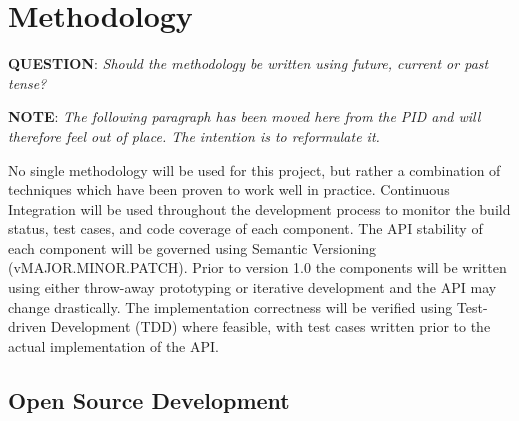 

\section{Methodology}
\label{sec:methodology}

\textbf{QUESTION}: \textit{Should the methodology be written using future, current or past tense?}



\textbf{NOTE}: \textit{The following paragraph has been moved here from the PID and will therefore feel out of place. The intention is to reformulate it.}

No single methodology will be used for this project, but rather a combination of techniques which have been proven to work well in practice. Continuous Integration will be used throughout the development process to monitor the build status, test cases, and code coverage of each component. The API stability of each component will be governed using Semantic Versioning (vMAJOR.MINOR.PATCH). Prior to version 1.0 the components will be written using either throw-away prototyping or iterative development and the API may change drastically. The implementation correctness will be verified using Test-driven Development (TDD) where feasible, with test cases written prior to the actual implementation of the API.




\subsection{Open Source Development}

